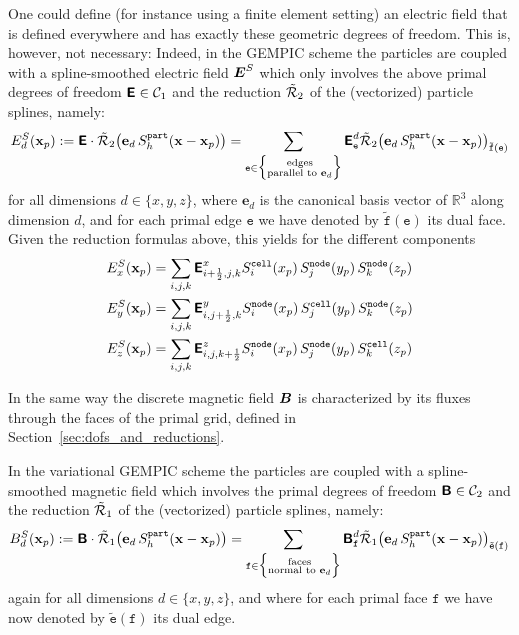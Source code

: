 \documentclass[11pt]{article}
\renewcommand{\part}{\texttt{part}}
\newcommand{\cell}{\texttt{cell}}
\newcommand{\node}{\texttt{node}}
\begin{document}
One could define (for instance using a finite element setting) an electric field that is defined everywhere and 
has exactly these geometric degrees of freedom. 
This is, however, not necessary: Indeed, in the GEMPIC scheme the particles are coupled with a 
spline-smoothed electric field ${\boldsymbol E}^S$ which only involves the above primal degrees of freedom ${\boldsymbol {\rm \mathsf{E}}} \in \mathcal{C}_1$
and the reduction $\tilde{\mathcal{R}}_2$ of the (vectorized) particle splines, namely:
$$
E^S_d(\mathbf{x}_p)  
:=  \arrE \cdot \tcR_2\big(\mathbf{e}_{d} \, S^\part_h(\mathbf{x}-\mathbf{x}_p)\big)
= \sum_{\texttt{e} \in \Big\{\substack{\text{edges} \\ \text{parallel to $\mathbf{e}_{d}$}}\Big\}} \arrE_{\texttt{e}}^d \tcR_2\big(\mathbf{e}_{d} \, S^\part_h(\mathbf{x}-\mathbf{x}_p)\big)_{\tilde{\texttt{f}}(\texttt{e})}
$$
for all dimensions $d \in \{x,y,z\}$, 
where $\mathbf{e}_{d}$ is the canonical basis vector of $\mathbb{R}^3$ along dimension $d$,
and for each primal edge $\texttt{e}$ we have denoted by $\tilde{\texttt{f}}(\texttt{e})$ its dual face.
Given the reduction formulas above, this yields for the different components
$$
\begin{aligned}
    E^S_x(\mathbf{x}_p) &= 
            \sum_{i,j,k} \arrE^{x}_{\iph,j,k} S^\cell_i(x_p)\,S^\node_j(y_p) \, S^\node_k(z_p) \\
    E^S_y(\mathbf{x}_p) &= 
            \sum_{i,j,k} \arrE^{y}_{i,\jph,k} S^\node_i(x_p)\,S^\cell_j(y_p) \, S^\node_k(z_p) \\
    E^S_z(\mathbf{x}_p) &= 
            \sum_{i,j,k} \arrE^{z}_{i,j,\kph} S^\node_i(x_p)\,S^\node_j(y_p) \, S^\cell_k(z_p)\\
\end{aligned}
$$

In the same way the discrete magnetic field ${\boldsymbol B}$ is characterized by its fluxes through the faces of the primal grid, 
defined in Section~\ref{sec:dofs_and_reductions}.

In the variational GEMPIC scheme the particles are coupled with a spline-smoothed magnetic field 
which involves the primal degrees of freedom ${\boldsymbol {\rm \mathsf{B}}} \in \mathcal{C}_2$
and the reduction $\tilde{\mathcal{R}}_1$ of the (vectorized) particle splines, namely:
$$
B^S_d(\mathbf{x}_p)
:=  \arrB \cdot \tcR_1\big(\mathbf{e}_{d} \, S^\part_h(\mathbf{x}-\mathbf{x}_p)\big)
= \sum_{\texttt{f} \in \Big\{\substack{\text{faces} \\ \text{normal to $\mathbf{e}_{d}$}}\Big\}} \arrB_{\texttt{f}}^d \tcR_1\big(\mathbf{e}_{d} \, S^\part_h(\mathbf{x}-\mathbf{x}_p)\big)_{\tilde{\texttt{e}}(\texttt{f})}
$$
again for all dimensions $d \in \{x,y,z\}$, 
and where for each primal face $\texttt{f}$ we have now denoted by $\tilde{\texttt{e}}(\texttt{f})$ its dual edge.
\end{document}
